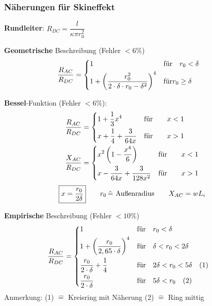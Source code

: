 \subsubsection{Näherungen für Skineffekt}
\textbf{Rundleiter}: $ R_{DC} = \dfrac{l}{\kappa \pi r_0^2}$
\begin{description}
	\item \textbf{Geometrische} Beschreibung (Fehler $ < 6\% $)
	  	\begin{align*}
		\frac{R_{AC}}{R_{DC}} & =
		\begin{dcases}
			1 & \text{für} \quad r_0 < \delta \\
			1+ \left( \frac{r_0^2}{2\cdot \delta \cdot r_0 - \delta^2} \right)^4  & \text{für} r_0 \geq \delta
		\end{dcases}
	\end{align*}
	
    \item \textbf{Bessel}-Funktion (Fehler $ < 6 \% $):
          \begin{align*}
              \frac{R_{AC}}{R_{DC}} & =
              \begin{dcases}
                  1 + \frac{1}{3}x^4              & \text{für} \qquad x < 1 \\
                  x + \frac{1}{4} + \frac{3}{64x} & \text{für} \qquad x > 1 \\
              \end{dcases} \\
              \frac{X_{AC}}{R_{DC}} & =
              \begin{dcases}
                  x^2\left( 1-\frac{x^4}{6} \right)   & \text{für} \qquad x < 1 \\
                  x- \frac{3}{64x} + \frac{3}{128x^2} & \text{für} \qquad x > 1 \\
              \end{dcases}
          \end{align*}
          \[
              \boxed{x=\frac{r_0}{2\delta}} \qquad r_0 \, \hat{=} \textnormal{ Außenradius} \qquad X_{AC} = wL_i
          \]
          
  	\item \textbf{Empirische} Beschreibung (Fehler $ < 10\% $)
  	\begin{align*}
  	\frac{R_{AC}}{R_{DC}} & =
  		\begin{dcases}
  			1               & \text{für} \quad r_0 < \delta \\
  			1+ \left( \frac{r_0}{2,65\cdot \delta} \right)^4  & \text{für} \quad \delta < r_0 < 2\delta \\
  			\frac{r_0}{2 \cdot\delta} + \frac{1}{4} & \text{für} \quad 2\delta < r_0 < 5\delta \quad (1) \\
  			\frac{r_0}{2\cdot \delta} & \text{für} \quad 5\delta < r_0 \quad (2)
  		\end{dcases}
  	\end{align*}
 \footnotesize Anmerkung: (1) $\widehat{=}$ Kreisring mit Näherung \quad (2) $\widehat{=}$ Ring mittig
\end{description}


